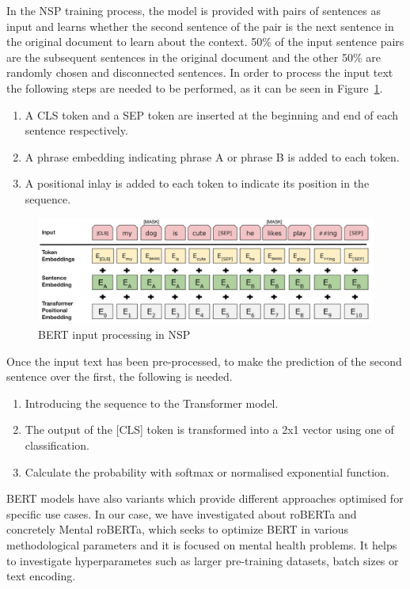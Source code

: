 In the NSP training process, the model is provided with pairs of sentences as input and learns whether the second sentence of the pair is the next sentence in the original document to learn about the context. 50\% of the input sentence pairs are the subsequent sentences in the original document and the other 50\% are randomly chosen and disconnected sentences. In order to process the input text the following steps are needed to be performed, as it can be seen in Figure~\ref{fig:BERTinput}.

\begin{enumerate}
    \item A CLS token and a SEP token are inserted at the beginning and end of each sentence respectively.
    \item A phrase embedding indicating phrase A or phrase B is added to each token.
    \item A positional inlay is added to each token to indicate its position in the sequence.
\end{enumerate}

\begin{figure}[!htp]
    \centering
    \includegraphics[scale=0.35]{img/detection/BERTinput.png}
    \caption{BERT input processing in NSP}
    \label{fig:BERTinput}
\end{figure}
Once the input text has been pre-processed, to make the prediction of the second sentence over the first, the following is needed.

\begin{enumerate}
    \item Introducing the sequence to the Transformer model.
    \item The output of the [CLS] token is transformed into a 2x1 vector using one of classification.
    \item Calculate the probability with softmax or normalised exponential function.
\end{enumerate}

BERT models have also variants which provide different approaches optimised for specific use cases. In our case, we have investigated about roBERTa and concretely Mental roBERTa, which seeks to optimize BERT in various methodological parameters and it is focused on mental health problems. It helps to investigate hyperparametes such as larger pre-training datasets, batch sizes or text encoding.

